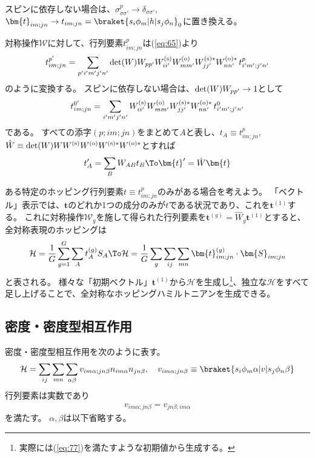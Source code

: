 \documentclass[11pt]{easymemo}
\begin{document}
スピンに依存しない場合は、$\sigma^{p}_{\sigma\sigma'}\to\delta_{\sigma\sigma'}$, $\bm{t}_{im;jn}\to t_{im;jn}=\braket{s_{i}\phi_{m}|h|s_{j}\phi_{n}}_{0}$に置き換える。

対称操作$\mathcal{W}$に対して、行列要素$t_{im;jn}^{p}$は(\ref{eq:65})より
\begin{align}
t_{im;jn}^{p'}=\sum_{p'i'm'j'n'}
{\rm det}(W)W_{pp'}W_{ii'}^{\rm (s)}W_{mm'}^{\rm (o)}W_{jj'}^{\rm (s)*}W_{nn'}^{\rm (o)*}\,t_{i'm';j'n'}^{p}
\end{align}
のように変換する。
スピンに依存しない場合は、${\rm det}(W)W_{pp'}\to1$として
\begin{align}
t_{im;jn}^{0'}=\sum_{i'm'j'n'}
W_{ii'}^{\rm (s)}W_{mm'}^{\rm (o)}W_{jj'}^{\rm (s)*}W_{nn'}^{\rm (o)*}\,t_{i'm';j'n'}^{0}
\end{align}
である。
すべての添字$(p;im;jn)$をまとめて$A$と表し、$t_{A}\equiv t_{im;jn}^{p}$, $\hat{W}\equiv {\rm det}(W)WW^{\rm (s)}W^{\rm (o)}W^{\rm (s)*}W^{\rm (o)*}$とすれば
\begin{align}
t_{A}'=\sum_{B}W_{AB}t_{B}
\To
\bm{t}'=\hat{W}\bm{t}
\end{align}

ある特定のホッピング行列要素$t\equiv t_{im;jn}^{p}$のみがある場合を考えよう。
「ベクトル」表示では、$\bm{t}$のどれか1つの成分のみが$t$である状況であり、これを$\bm{t}^{(1)}$する。
これに対称操作$\mathcal{W}_{g}$を施して得られた行列要素を$\bm{t}^{(g)}=\hat{W}_{g}\bm{t}^{(1)}$とすると、全対称表現のホッピングは
\begin{align}
\mathcal{H}=\frac{1}{G}\sum_{g=1}^{G}\sum_{A}t_{A}^{(g)}S_{A}
\To
\mathcal{H}=\frac{1}{G}\sum_{g}\sum_{ij}\sum_{mn}\bm{t}_{im;jn}^{(g)}\cdot\bm{S}_{im;jn}
\end{align}
と表される。
様々な「初期ベクトル」$\bm{t}^{(1)}$から$\mathcal{H}$を生成し\footnote{実際には(\ref{eq:77})を満たすような初期値から生成する。}、独立な$\mathcal{H}$をすべて足し上げることで、全対称なホッピングハミルトニアンを生成できる。


\subsection{密度・密度型相互作用}

密度・密度型相互作用を次のように表す。
\begin{align}
\mathcal{H}=\sum_{ij}\sum_{mn}\sum_{\alpha\beta}
v_{im\alpha;jn\beta}n_{im\alpha}n_{jn\beta},
\quad
v_{im\alpha;jn\beta}\equiv\braket{s_{i}\phi_{m}\alpha|v|s_{j}\phi_{n}\beta}
\end{align}
行列要素は実数であり
\begin{align}
v_{im\alpha;jn\beta}=v_{jn\beta;im\alpha}
\label{eq:84}
\end{align}
を満たす。
$\alpha,\beta$は以下省略する。
\end{document}
